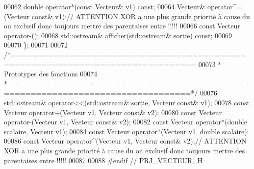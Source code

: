 \begin{DoxyCode}
00062     \textcolor{keywordtype}{double} operator*(\textcolor{keyword}{const} Vecteur& v1) \textcolor{keyword}{const};
00064     Vecteur& operator^=(Vecteur \textcolor{keyword}{const}& v1);\textcolor{comment}{// ATTENTION XOR a une plus grande priorité à cause du ou
       exclusif donc toujours mettre des parentaises entre !!!!!}
00066 \textcolor{comment}{}    \textcolor{keyword}{const} Vecteur operator-(); 
00068     std::ostream& afficher(std::ostream& sortie) \textcolor{keyword}{const};
00069 
00070 \};
00071 
00072 \textcolor{comment}{/*================================================================================}
00073 \textcolor{comment}{ * Prototypes des fonctions}
00074 \textcolor{comment}{ *================================================================================*/}
00076 std::ostream& operator<<(std::ostream& sortie, Vecteur \textcolor{keyword}{const}& v1);
00078 \textcolor{keyword}{const} Vecteur operator+(Vecteur v1, Vecteur \textcolor{keyword}{const}& v2);
00080 \textcolor{keyword}{const} Vecteur operator-(Vecteur v1, Vecteur \textcolor{keyword}{const}& v2);
00082 \textcolor{keyword}{const} Vecteur operator*(\textcolor{keywordtype}{double} scalaire, Vecteur v1);
00084 \textcolor{keyword}{const} Vecteur operator*(Vecteur v1, \textcolor{keywordtype}{double} scalaire);
00086 \textcolor{keyword}{const} Vecteur operator^(Vecteur v1, Vecteur \textcolor{keyword}{const}& v2);\textcolor{comment}{// ATTENTION XOR a une plus grande priorité à cause
       du ou exclusif donc toujours mettre des parentaises entre !!!!!}
00087 
00088 \textcolor{preprocessor}{#endif // PRJ\_VECTEUR\_H}
\end{DoxyCode}
